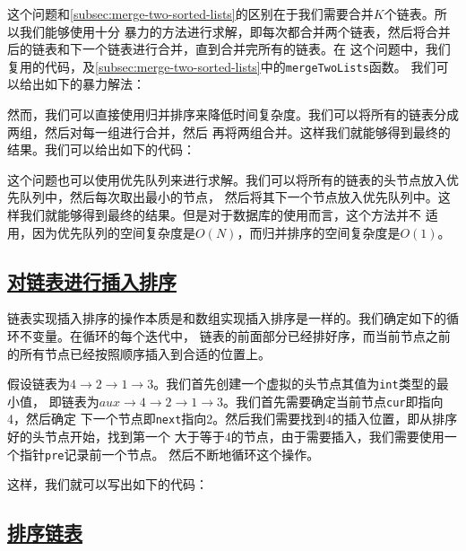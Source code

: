 \documentclass[../../main.tex]{subfiles}
\begin{document}
这个问题和\ref{subsec:merge-two-sorted-lists}的区别在于我们需要合并$K$个链表。所以我们能够使用十分
暴力的方法进行求解，即每次都合并两个链表，然后将合并后的链表和下一个链表进行合并，直到合并完所有的链表。在
这个问题中，我们复用的代码，及\ref{subsec:merge-two-sorted-lists}中的\verb|mergeTwoLists|函数。
我们可以给出如下的暴力解法：



然而，我们可以直接使用归并排序来降低时间复杂度。我们可以将所有的链表分成两组，然后对每一组进行合并，然后
再将两组合并。这样我们就能够得到最终的结果。我们可以给出如下的代码：



\begin{kaobox}[title=使用优先队列]
  这个问题也可以使用优先队列来进行求解。我们可以将所有的链表的头节点放入优先队列中，然后每次取出最小的节点，
  然后将其下一个节点放入优先队列中。这样我们就能够得到最终的结果。但是对于数据库的使用而言，这个方法并不
  适用，因为优先队列的空间复杂度是$O(N)$，而归并排序的空间复杂度是$O(1)$。
\end{kaobox}

\subsection{\href{https://leetcode.cn/problems/insertion-sort-list/}{对链表进行插入排序}}
\label{subsec:insertion-sort-list}

链表实现插入排序的操作本质是和数组实现插入排序是一样的。我们确定如下的循环不变量。在循环的每个迭代中，
链表的前面部分已经排好序，而当前节点之前的所有节点已经按照顺序插入到合适的位置上。

\begin{example}
  假设链表为$4 \to 2 \to 1 \to 3$。我们首先创建一个虚拟的头节点其值为\texttt{int}类型的最小值，
  即链表为$aux \to 4 \to 2 \to 1 \to 3$。我们首先需要确定当前节点\texttt{cur}即指向4，然后确定
  下一个节点即\texttt{next}指向2。然后我们需要找到4的插入位置，即从排序好的头节点开始，找到第一个
  大于等于4的节点，由于需要插入，我们需要使用一个指针\texttt{pre}记录前一个节点。
  然后不断地循环这个操作。
\end{example}

这样，我们就可以写出如下的代码：



\subsection{\href{https://leetcode.cn/problems/sort-list/}{排序链表}}
\label{subsec:sort-list}
\end{document}
